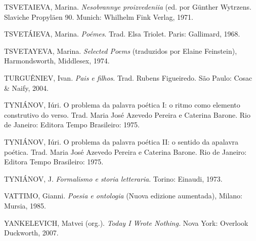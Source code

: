TSVETAIEVA, Marina. \emph{Nesobrannye proizvedeniia} (ed. por Günther
Wytrzens. Slaviche Propyläen 90. Munich: Whilhelm Fink Verlag, 1971.

TSVETÁIEVA, Marina. \emph{Poémes}. Trad. Elsa Triolet. Paris: Gallimard,
1968.

TSVETAYEVA, Marina. \emph{Selected Poems} (traduzidos por Elaine
Feinstein), Harmondsworth, Middlesex, 1974.

TURGUÊNIEV, Ivan. \emph{Pais e filhos}. Trad. Rubens Figueiredo. São
Paulo: Cosac \& Naify, 2004.

TYNIÁNOV, Iúri. O problema da palavra poética I: o ritmo como elemento
construtivo do verso. Trad. Maria José Azevedo Pereira e Caterina
Barone. Rio de Janeiro: Editora Tempo Brasileiro: 1975.

TYNIÁNOV, Iúri. O problema da palavra poética II: o sentido da apalavra
poética. Trad. Maria José Azevedo Pereira e Caterina Barone. Rio de
Janeiro: Editora Tempo Brasileiro: 1975.

TYNIÁNOV, J. \emph{Formalismo e storia letteraria}. Torino: Einaudi,
1973.

VATTIMO, Gianni. \emph{Poesia e ontologia} (Nuova edizione aumentada),
Milano: Mursia, 1985.

YANKELEVICH, Matvei (org.). \emph{Today I Wrote Nothing.} Nova York:
Overlook Duckworth, 2007.
